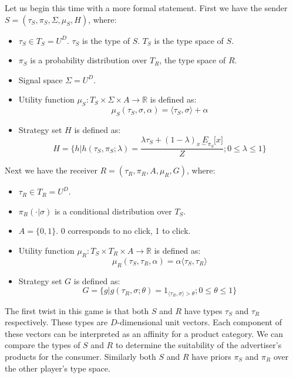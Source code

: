\documentclass{article}
\begin{document}
Let us begin this time with a more formal statement. First we have the sender $S = (\tau_S, \pi_S, \Sigma, \mu_S, H)$, where:
\begin{itemize}
	\item $\tau_S \in T_S = U^D$. $\tau_S$ is the type of $S$. $T_S$ is the type space of $S$.
	\item $\pi_S$ is a probability distribution over $T_R$, the type space of $R$.
	\item Signal space $\Sigma = U^D$.
	\item Utility function $\mu_S: T_S \times \Sigma \times A \rightarrow \mathbb{R}$ is defined as:
	\begin{equation}
		\mu_S(\tau_S, \sigma, \alpha) = \langle \tau_S, \sigma \rangle + \alpha
	\end{equation}
	\item Strategy set $H$ is defined as:
	\begin{equation}
		H = \lbrace h | h(\tau_S, \pi_S; \lambda) = \frac{\lambda \tau_S + (1-\lambda)\underset{x\sim\pi_S}{E}\lbrack x \rbrack}{Z}; 0 \le \lambda \le 1 \rbrace
	\end{equation}
\end{itemize}

\noindent Next we have the receiver $R = (\tau_R, \pi_R, A, \mu_R, G)$, where:
\begin{itemize}
	\item $\tau_R \in T_R = U^D$.
	\item $\pi_R(\cdot|\sigma)$ is a conditional distribution over $T_S$.
	\item $A = \lbrace 0,1 \rbrace$. 0 corresponds to no click, 1 to click.
	\item Utility function $\mu_R: T_S \times T_R \times A \rightarrow \mathbb{R}$ is defined as:
	\begin{equation}
		\mu_R(\tau_S, \tau_R, \alpha) = \alpha \langle \tau_S, \tau_R \rangle
	\end{equation}
	\item Strategy set $G$ is defined as:
	\begin{equation}
		G = \lbrace g | g(\tau_R, \sigma; \theta) = 1_{\langle \tau_R, \sigma \rangle > \theta}; 0 \le \theta \le 1 \rbrace
	\end{equation}
\end{itemize}

\noindent The first twist in this game is that both $S$ and $R$ have types $\tau_S$ and $\tau_R$ respectively. These types are $D$-dimensional unit vectors. Each component of these vectors can be interpreted as an affinity for a product category. We can compare the types of $S$ and $R$ to determine the suitability of the advertiser's products for the consumer. Similarly both $S$ and $R$ have priors $\pi_S$ and $\pi_R$ over the other player's type space.
\end{document}
